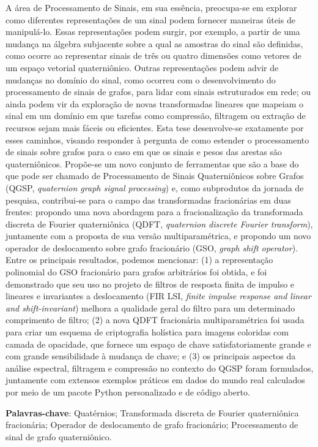 
%

A área de Processamento de Sinais, em sua essência, preocupa-se em explorar como diferentes representações de um sinal podem fornecer maneiras úteis de manipulá-lo. Essas representações podem surgir, por exemplo, a partir de uma mudança na álgebra subjacente sobre a qual as amostras do sinal são definidas, como ocorre ao representar sinais de três ou quatro dimensões como vetores de um espaço vetorial quaterniônico. Outras representações podem advir de mudanças no domínio do sinal, como ocorreu com o desenvolvimento do processamento de sinais de grafos, para lidar com sinais estruturados em rede; ou ainda podem vir da exploração de novas transformadas lineares que mapeiam o sinal em um domínio em que tarefas como compressão, filtragem ou extração de recursos sejam mais fáceis ou eficientes.
Esta tese desenvolve-se exatamente por esses caminhos, visando responder à pergunta de como estender o processamento de sinais sobre grafos para o caso em que os sinais e pesos das arestas são quaterniônicos. Propõe-se um novo conjunto de ferramentas que são a base do que pode ser chamado de Processamento de Sinais Quaterniônicos sobre Grafos (QGSP, \emph{quaternion graph signal processing}) e, como subprodutos da jornada de pesquisa, contribui-se para o campo das transformadas fracionárias em duas frentes: propondo uma nova abordagem para a fracionalização da transformada discreta de Fourier quaterniônica (QDFT, \emph{quaternion discrete Fourier transform}), juntamente com a proposta de sua versão multiparamétrica, e propondo um novo operador de deslocamento sobre grafo fracionário (GSO, \emph{graph shift operator}).
Entre os principais resultados, podemos mencionar: (1) a representação polinomial do GSO fracionário para grafos arbitrários foi obtida, e foi demonstrado que seu uso no projeto de filtros de resposta finita de impulso e lineares e invariantes a deslocamento (FIR LSI, \emph{finite impulse response and linear and shift-invariant}) melhora a qualidade geral do filtro para um determinado comprimento de filtro; (2) a nova QDFT fracionária multiparamétrica foi usada para criar um esquema de criptografia holística para imagens coloridas com camada de opacidade, que fornece um espaço de chave satisfatoriamente grande e com grande sensibilidade à mudança de chave; e (3) os principais aspectos da análise espectral, filtragem e compressão no contexto do QGSP foram formulados, juntamente com extensos exemplos práticos em dados do mundo real calculados por meio de um pacote Python personalizado e de código aberto.
\vspace{1em}

\noindent
\textbf{Palavras-chave}: Quatérnios; Transformada discreta de Fourier quaterniônica fracionária; Operador de deslocamento de grafo fracionário; Processamento de sinal de grafo quaterniônico.